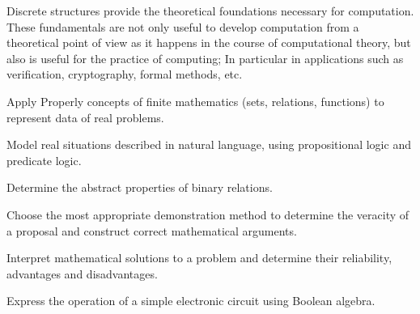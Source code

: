 \begin{syllabus}


\begin{justification}

Discrete structures provide the theoretical foundations necessary for computation. These fundamentals are not only useful to develop computation from a theoretical point of view as it happens 
in the course of computational theory, but also is useful for the practice of computing; In particular in applications such as verification,
cryptography, formal methods, etc.

\end{justification}

\begin{goals}
\item Apply Properly concepts of finite mathematics (sets, relations, functions) to represent data of real problems.
\item Model real situations described in natural language, using propositional logic and predicate logic.
\item Determine the abstract properties of binary relations.
\item Choose the most appropriate demonstration method to determine the veracity of a proposal and construct correct mathematical arguments.
\item Interpret mathematical solutions to a problem and determine their reliability, advantages and disadvantages.
\item Express the operation of a simple electronic circuit using Boolean algebra.
\end{goals}

\begin{outcomes}
    \item {}
    \item {}
    \item {}
\end{outcomes}

\begin{competences}
    \item {}
    \item {}
\end{competences}


\end{syllabus}
